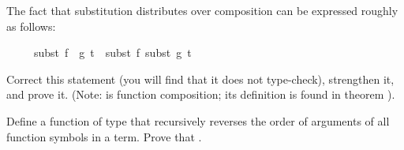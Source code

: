 \begin{isabellebody}
\begin{isamarkuptext}
\begin{exercise}
The fact that substitution distributes over composition can be expressed
roughly as follows:
\begin{isabelle}%
\ \ \ \ \ subst\ {}f\ {}\ g{}\ t\ {}\ subst\ f\ {}subst\ g\ t{}%
\end{isabelle}
Correct this statement (you will find that it does not type-check),
strengthen it, and prove it. (Note:  is function composition;
its definition is found in theorem ).
\end{exercise}
\begin{exercise}\label{ex:trev-trev}
  Define a function  of type 
that recursively reverses the order of arguments of all function symbols in a
  term. Prove that .
\end{exercise}


\end{isamarkuptext}
\end{isabellebody}
